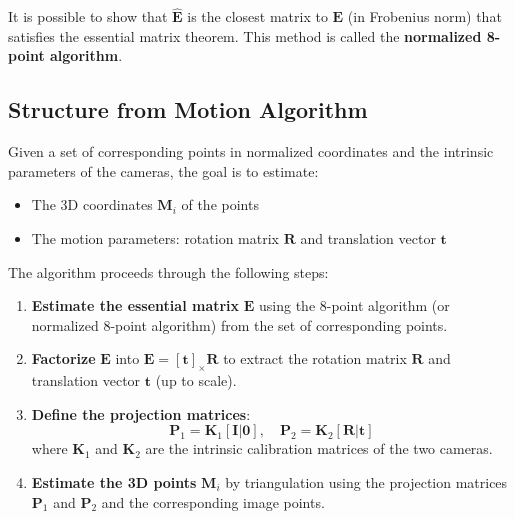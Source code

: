 \documentclass[11pt,a4paper]{article}
\theoremstyle{definition}
\theoremstyle{plain}
\theoremstyle{remark}
\begin{document}
It is possible to show that $\hat{\mathbf{E}}$ is the closest matrix to $\mathbf{E}$ (in Frobenius norm) that satisfies the essential matrix theorem.
This method is called the \textbf{normalized 8-point algorithm}.

\subsection{Structure from Motion Algorithm}\label{subsec:structure_from_motion}

\begin{tcolorbox}[colback=blue!5!white,colframe=blue!75!black,title=Structure from Motion Algorithm]
Given a set of corresponding points in normalized coordinates and the intrinsic parameters of the cameras, the goal is to estimate:
\begin{itemize}
    \item The 3D coordinates $\mathbf{M}_i$ of the points
    \item The motion parameters: rotation matrix $\mathbf{R}$ and translation vector $\mathbf{t}$
\end{itemize}
\end{tcolorbox}

The algorithm proceeds through the following steps:

\begin{enumerate}
    \item \textbf{Estimate the essential matrix} $\mathbf{E}$ using the 8-point algorithm (or normalized 8-point algorithm) from the set of corresponding points.
    
    \item \textbf{Factorize} $\mathbf{E}$ into $\mathbf{E} = [\mathbf{t}]_{\times} \mathbf{R}$ to extract the rotation matrix $\mathbf{R}$ and translation vector $\mathbf{t}$ (up to scale).
    
    \item \textbf{Define the projection matrices}:
    \begin{equation} \nonumber
        \mathbf{P}_1 = \mathbf{K}_1 [\mathbf{I} | \mathbf{0}], \quad \mathbf{P}_2 = \mathbf{K}_2 [\mathbf{R} | \mathbf{t}]
    \end{equation}
    where $\mathbf{K}_1$ and $\mathbf{K}_2$ are the intrinsic calibration matrices of the two cameras.
    
    \item \textbf{Estimate the 3D points} $\mathbf{M}_i$ by triangulation using the projection matrices $\mathbf{P}_1$ and $\mathbf{P}_2$ and the corresponding image points.
\end{enumerate}
\end{document}
